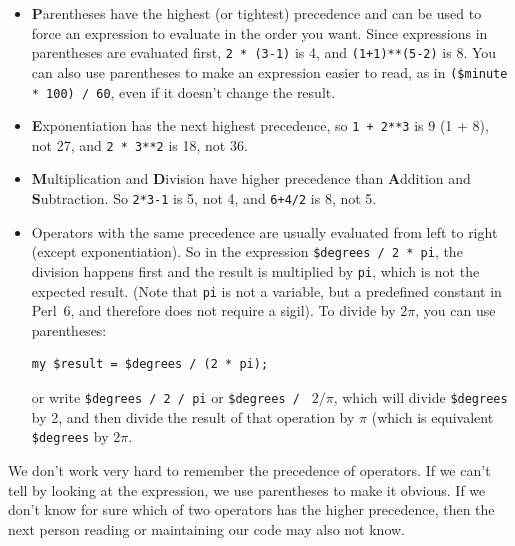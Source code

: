 \begin{itemize}

\item {\bf P}arentheses have the highest (or tightest) precedence and can be used 
to force an expression to evaluate in the order you want. Since
expressions in parentheses are evaluated first, {\tt 2 * (3-1)} is 4,
and {\tt (1+1)**(5-2)} is 8. You can also use parentheses to make an
expression easier to read, as in {\tt (\$minute * 100) / 60}, even
if it doesn't change the result.

\item {\bf E}xponentiation has the next highest precedence, so
{\tt 1 + 2**3} is 9 (1 + 8), not 27, and {\tt 2 * 3**2} is 18, not 36.

\item {\bf M}ultiplication and {\bf D}ivision have higher precedence
  than {\bf A}ddition and {\bf S}ubtraction.  So {\tt 2*3-1} is 5, not
  4, and {\tt 6+4/2} is 8, not 5.

\item Operators with the same precedence are usually evaluated from left to
  right (except exponentiation).  So in the expression {\tt \$degrees / 2 * pi}, the division happens first and the result is multiplied
  by {\tt pi}, which is not the expected result. (Note that {\tt pi} is not a variable, but a predefined 
  constant in Perl~6, and therefore does not require a sigil).  To 
  divide by $2 \pi$, you can use parentheses:
  
\begin{verbatim}
my $result = $degrees / (2 * pi);  
\end{verbatim}  
 
or write
  {\tt \$degrees / 2 / pi} or {\tt \$degrees / } $2 / \pi$, which 
  will divide \verb'$degrees' by 2, and then divide the result of 
  that operation by $\pi$ (which is equivalent \verb'$degrees' by 
   $2 \pi$.

\end{itemize}

We don't work very hard to remember the precedence of
operators.  If we can't tell by looking at the expression, we use
parentheses to make it obvious. If we don't know for sure which of two operators 
has the higher precedence, then the next person reading or maintaining 
our code may also not know.


